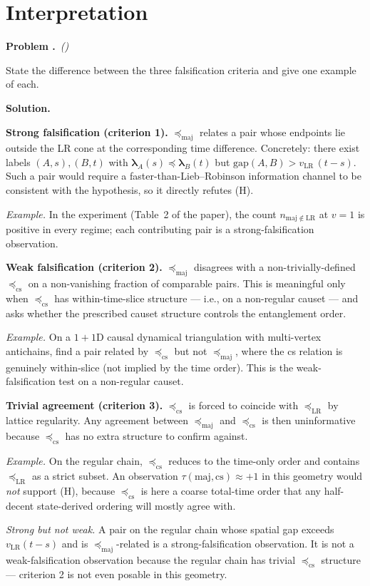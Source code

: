 \documentclass[11pt,a4paper]{article}
\newcounter{problem}
\newenvironment{problem}[1][]{%
  \refstepcounter{problem}%
  \par\medskip\noindent
  \textbf{Problem \theproblem.}\if\relax\detokenize{#1}\relax\else\ \textit{(#1)}\fi\quad\ignorespaces
}{\par\smallskip}
\newenvironment{solution}{%
  \par\noindent\textbf{Solution.}\quad\ignorespaces
}{\par\medskip}
\newcommand{\maj}{\mathrm{maj}}
\newcommand{\LR}{\mathrm{LR}}
\newcommand{\cs}{\mathrm{cs}}
\newcommand{\preceqmaj}{\preceq_{\maj}}
\newcommand{\preceqLR}{\preceq_{\LR}}
\newcommand{\preceqcs}{\preceq_{\cs}}
\begin{document}
\section{Interpretation}

\begin{problem}
State the difference between the three falsification criteria and
give one example of each.
\end{problem}

\begin{solution}
\textbf{Strong falsification (criterion 1).}  $\preceqmaj$ relates a
pair whose endpoints lie outside the LR cone at the corresponding
time difference.  Concretely: there exist labels $(A, s), (B, t)$
with $\bm\lambda_A(s) \preceq \bm\lambda_B(t)$ but
$\mathrm{gap}(A, B) > v_{\LR}\, (t - s)$.  Such a pair would require
a faster-than-Lieb--Robinson information channel to be consistent
with the hypothesis, so it directly refutes (H).

\textit{Example.}  In the experiment (Table~2 of the paper), the count
$n_{\maj \notin \LR}$ at $v = 1$ is positive in every regime; each
contributing pair is a strong-falsification observation.

\smallskip
\textbf{Weak falsification (criterion 2).}  $\preceqmaj$ disagrees
with a non-trivially-defined $\preceqcs$ on a non-vanishing fraction
of comparable pairs.  This is meaningful only when $\preceqcs$ has
within-time-slice structure --- i.e., on a non-regular causet --- and
asks whether the prescribed causet structure controls the
entanglement order.

\textit{Example.}  On a $1{+}1$D causal dynamical triangulation
with multi-vertex antichains, find a pair related by $\preceqcs$
but not $\preceqmaj$, where the cs relation is genuinely
within-slice (not implied by the time order).  This is the
weak-falsification test on a non-regular causet.

\smallskip
\textbf{Trivial agreement (criterion 3).}  $\preceqcs$ is forced to
coincide with $\preceqLR$ by lattice regularity.  Any agreement
between $\preceqmaj$ and $\preceqcs$ is then uninformative because
$\preceqcs$ has no extra structure to confirm against.

\textit{Example.}  On the regular chain, $\preceqcs$ reduces to the
time-only order and contains $\preceqLR$ as a strict subset.  An
observation $\tau(\maj, \cs) \approx +1$ in this geometry would
\emph{not} support (H), because $\preceqcs$ is here a coarse
total-time order that any half-decent state-derived ordering will
mostly agree with.

\smallskip
\textit{Strong but not weak.}  A pair on the regular chain whose
spatial gap exceeds $v_{\LR}(t - s)$ and is $\preceqmaj$-related is a
strong-falsification observation.  It is not a weak-falsification
observation because the regular chain has trivial $\preceqcs$
structure --- criterion 2 is not even posable in this geometry.
\end{solution}
\end{document}
